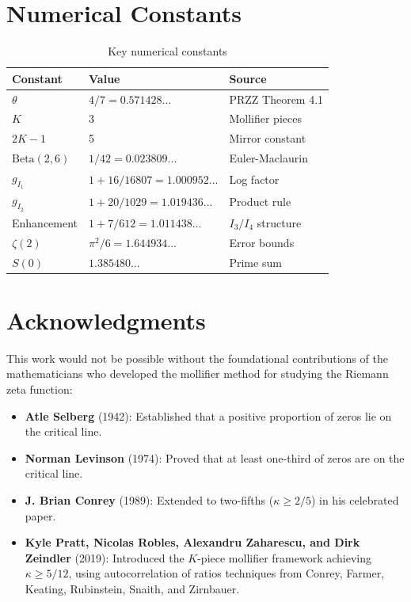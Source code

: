 \documentclass[11pt]{article}
\begin{document}
\section{Numerical Constants}
\label{app:constants}

\begin{table}[h]
\centering
\caption{Key numerical constants}
\begin{tabular}{lll}
\toprule
Constant & Value & Source \\
\midrule
$\theta$ & $4/7 = 0.571428...$ & PRZZ Theorem 4.1 \\
$K$ & 3 & Mollifier pieces \\
$2K-1$ & 5 & Mirror constant \\
$\text{Beta}(2,6)$ & $1/42 = 0.023809...$ & Euler-Maclaurin \\
$g_{I_1}$ & $1 + 16/16807 = 1.000952...$ & Log factor \\
$g_{I_2}$ & $1 + 20/1029 = 1.019436...$ & Product rule \\
Enhancement & $1 + 7/612 = 1.011438...$ & $I_3/I_4$ structure \\
$\zeta(2)$ & $\pi^2/6 = 1.644934...$ & Error bounds \\
$S(0)$ & $1.385480...$ & Prime sum \\
\bottomrule
\end{tabular}
\end{table}

\section{Acknowledgments}
\label{app:acknowledgments}

This work would not be possible without the foundational contributions of the mathematicians who developed the mollifier method for studying the Riemann zeta function:

\begin{itemize}
\item \textbf{Atle Selberg} (1942): Established that a positive proportion of zeros lie on the critical line.
\item \textbf{Norman Levinson} (1974): Proved that at least one-third of zeros are on the critical line.
\item \textbf{J. Brian Conrey} (1989): Extended to two-fifths ($\kappa \geq 2/5$) in his celebrated paper.
\item \textbf{Kyle Pratt, Nicolas Robles, Alexandru Zaharescu, and Dirk Zeindler} (2019): Introduced the $K$-piece mollifier framework achieving $\kappa \geq 5/12$, using autocorrelation of ratios techniques from Conrey, Farmer, Keating, Rubinstein, Snaith, and Zirnbauer.
\end{itemize}
\end{document}
